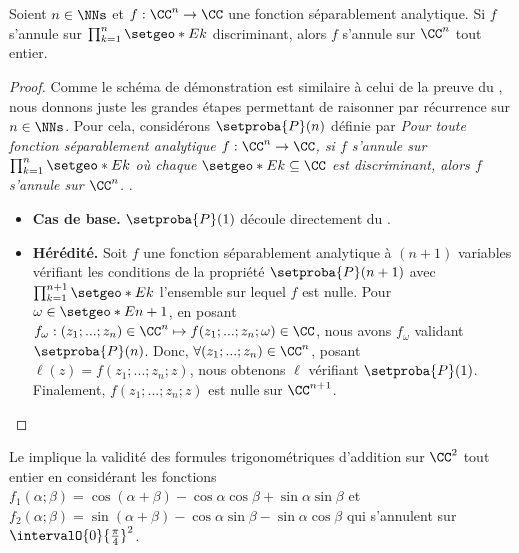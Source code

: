\begin{fact} \label{sep-isolated-zero}
    Soient $n \in \NNs$
    et
    $f: \CC^n \rightarrow \CC$ une fonction séparablement analytique.
	Si $f$ s'annule sur $\prod_{k=1}^{n} \setgeo*{E}{k}$ discriminant,
	alors $f$ s'annule sur $\CC^n$ tout entier. 
\end{fact}


\begin{proof}
	Comme le schéma de démonstration est similaire à celui de la preuve du ,
	nous donnons juste les grandes étapes permettant de raisonner par récurrence sur $n \in \NNs$.
	Pour cela, considérons $\setproba{P}(n)$ définie par
	\emph{\og 
		Pour toute fonction séparablement analytique $f: \CC^n \rightarrow \CC$,
		si $f$ s'annule sur $\prod_{k=1}^{n} \setgeo*{E}{k}$ où chaque $\setgeo*{E}{k} \subseteq \CC$ est discriminant,
		alors $f$ s'annule sur $\CC^n$. 
	\fg}\kern2pt.
	\begin{itemize}[label=\small\textbullet]
		\item \textbf{Cas de base.}
		$\setproba{P}(1)$ découle directement du .


		\item \textbf{Hérédité.}
		Soit $f$ une fonction séparablement analytique à $(n + 1)$ variables vérifiant les conditions de la propriété $\setproba{P}(n + 1)$
		avec
		$\prod_{k=1}^{n+1} \setgeo*{E}{k}$ l'ensemble sur lequel $f$ est nulle.
		Pour $\omega \in \setgeo*{E}{n+1}$,
		en posant
		$f_\omega: (z_1 ; ... ; z_n) \in \CC^n \mapsto f(z_1 ; ... ; z_n ; \omega) \in \CC$,
		nous avons $f_\omega$ validant $\setproba{P}(n)$.
		Donc, $\forall (z_1 ; ... ; z_n) \in \CC^n$,
		posant $\ell(z) = f(z_1 ; ... ; z_n ; z)$,
		nous obtenons $\ell$ vérifiant $\setproba{P}(1)$.
		Finalement,
		$f(z_1 ; ... ; z_n ; z)$ est nulle sur $\CC^{n+1}$.
	\end{itemize}

	\null\vspace{-6ex}
\end{proof}




\begin{example}
    Le  implique la validité des formules trigonométriques d'addition sur $\CC^2$ tout entier en considérant les fonctions
    $f_1(\alpha ; \beta) = \cos(\alpha + \beta) - \cos \alpha \cos \beta + \sin \alpha \sin \beta$
    et
    $f_2(\alpha ; \beta) = \sin(\alpha + \beta) - \cos \alpha \sin \beta - \sin \alpha \cos \beta$
    qui s'annulent sur $\intervalO{0}{\frac{\pi}{4}}^2$.
\end{example}


